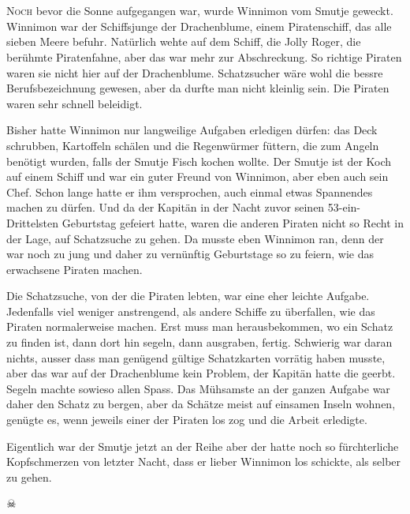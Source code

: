 \chapter*{}
\lettrine[lines=3]{\color{DeepPink}N}{och} bevor die Sonne aufgegangen war, wurde Winnimon vom Smutje geweckt. Winnimon war der Schiffsjunge der Drachenblume, einem Piratenschiff, das alle sieben Meere befuhr. Natürlich wehte auf dem Schiff, die Jolly Roger, die berühmte Piratenfahne, aber das war mehr zur Abschreckung. So richtige Piraten waren sie nicht hier auf der Drachenblume. Schatzsucher wäre wohl die bessre Berufsbezeichnung gewesen, aber da durfte man nicht kleinlig sein. Die Piraten waren sehr schnell beleidigt.

Bisher hatte Winnimon nur langweilige Aufgaben erledigen dürfen: das Deck schrubben, Kartoffeln schälen und die Regenwürmer füttern, die zum Angeln benötigt wurden, falls der Smutje Fisch kochen wollte. Der Smutje ist der Koch auf einem Schiff und war ein guter Freund von Winnimon, aber eben auch sein Chef. Schon lange hatte er ihm versprochen, auch einmal etwas Spannendes machen zu dürfen. Und da der Kapitän in der Nacht zuvor seinen 53-ein-Drittelsten Geburtstag gefeiert hatte, waren die anderen Piraten nicht so Recht in der Lage, auf Schatzsuche zu gehen. Da musste eben Winnimon ran, denn der war noch zu jung und daher zu vernünftig Geburtstage so zu feiern, wie das erwachsene Piraten machen.

Die Schatzsuche, von der die Piraten lebten, war eine eher leichte Aufgabe. Jedenfalls viel weniger anstrengend, als andere Schiffe zu überfallen, wie das Piraten normalerweise machen. Erst muss man herausbekommen, wo ein Schatz zu finden ist, dann dort hin segeln, dann ausgraben, fertig. Schwierig war daran nichts, ausser dass man genügend gültige Schatzkarten vorrätig haben musste, aber das war auf der Drachenblume kein Problem, der Kapitän hatte die geerbt. Segeln machte sowieso allen Spass. Das Mühsamste an der ganzen Aufgabe war daher den Schatz zu bergen, aber da Schätze meist auf einsamen Inseln wohnen, genügte es, wenn jeweils einer der Piraten los zog und die Arbeit erledigte.

Eigentlich war der Smutje jetzt an der Reihe aber der hatte noch so fürchterliche Kopfschmerzen von letzter Nacht, dass er lieber Winnimon los schickte, als selber zu gehen.

\begin{center}
{ $\skull$}
\end{center}

